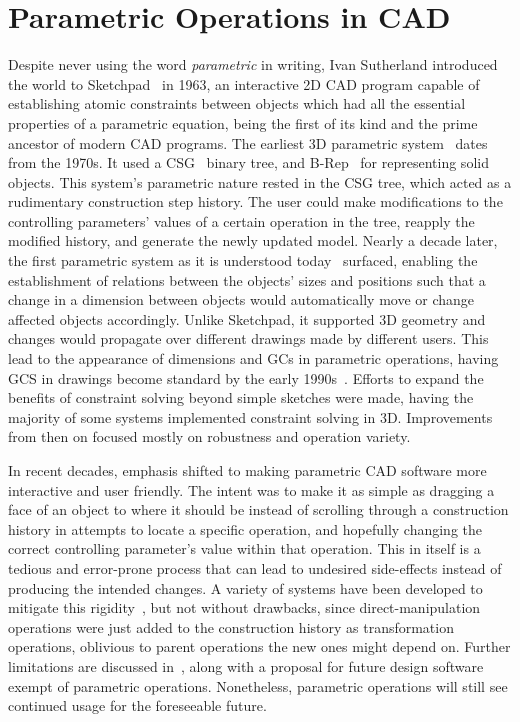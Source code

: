 \section{Parametric Operations in \acs{CAD}}%
\label{sec:intro.parametric}

Despite never using the word \textit{parametric} in writing, Ivan Sutherland
introduced the world to Sketchpad~\cite{Sutherland:1964:Sketchpad} in 1963, an
interactive 2D \ac{CAD} program capable of establishing atomic constraints
between objects which had all the essential properties of a parametric equation,
being the first of its kind and the prime ancestor of modern \ac{CAD} programs.
The earliest 3D parametric system~\cite{Requicha:1980:RRS:356827.356833} dates
from the 1970s.  It used a \ac{CSG}~\cite{Foley:1996:CGPP,Requicha:1977:CSG}
binary tree, and \ac{B-Rep}~\cite{Stroud:2006:BRMT} for representing solid
objects.  This system's parametric nature rested in the \ac{CSG} tree, which
acted as a rudimentary construction step history.  The user could make
modifications to the controlling parameters' values of a certain operation in
the tree, reapply the modified history, and generate the newly updated model.
Nearly a decade later, the first parametric system as it is understood
today~\cite{Jabi:2013:PDA,PTC:1980:ProENGINEER} surfaced, enabling the
establishment of relations between the objects' sizes and positions such that a
change in a dimension between objects would automatically move or change
affected objects accordingly.  Unlike Sketchpad, it supported 3D geometry and
changes would propagate over different drawings made by different users.  This
lead to the appearance of dimensions and \acp{GC} in parametric operations,
having \ac{GCS} in drawings become standard by the early
1990s~\cite{Bouma:1995:GCS,Chung:1990:TEVPD,Owen:1991:ASGDC}.  Efforts to expand
the benefits of constraint solving beyond simple sketches were made, having the
majority of some systems implemented constraint solving in 3D.  Improvements
from then on focused mostly on robustness and operation variety.

In recent decades, emphasis shifted to making parametric \ac{CAD} software more
interactive and user friendly.  The intent was to make it as simple as dragging
a face of an object to where it should be instead of scrolling through a
construction history in attempts to locate a specific operation, and hopefully
changing the correct controlling parameter's value within that operation.  This
in itself is a tedious and error-prone process that can lead to undesired
side-effects instead of producing the intended changes.  A variety of systems
have been developed to mitigate this
rigidity~\cite{Clarke:2009:SM,Samuel:2006:CPPUP,Wu:2007:MSMSM}, but not without
drawbacks, since direct-manipulation operations were just added to the
construction history as transformation operations, oblivious to parent
operations the new ones might depend on.  Further limitations are discussed
in~\cite{Bettig:2005:LPOSSD}, along with a proposal for future design software
exempt of parametric operations.  Nonetheless, parametric operations will still
see continued usage for the foreseeable future.
